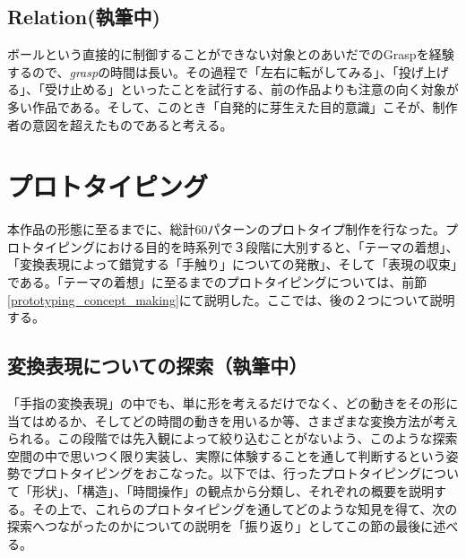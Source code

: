 \subsection*{Relation(執筆中)}
ボールという直接的に制御することができない対象とのあいだでのGraspを経験するので、\textit{grasp}の時間は長い。その過程で「左右に転がしてみる」、「投げ上げる」、「受け止める」といったことを試行する、前の作品よりも注意の向く対象が多い作品である。そして、このとき「自発的に芽生えた目的意識」こそが、制作者の意図を超えたものであると考える。




\section{プロトタイピング}
本作品の形態に至るまでに、総計60パターンのプロトタイプ制作を行なった。プロトタイピングにおける目的を時系列で３段階に大別すると、「テーマの着想」、「変換表現によって錯覚する「手触り」についての発散」、そして「表現の収束」である。「テーマの着想」に至るまでのプロトタイピングについては、前節\ref{prototyping_concept_making}にて説明した。ここでは、後の２つについて説明する。

\subsection{変換表現についての探索（執筆中）}
「手指の変換表現」の中でも、単に形を考えるだけでなく、どの動きをその形に当てはめるか、そしてどの時間の動きを用いるか等、さまざまな変換方法が考えられる。この段階では先入観によって絞り込むことがないよう、このような探索空間の中で思いつく限り実装し、実際に体験することを通して判断するという姿勢でプロトタイピングをおこなった。以下では、行ったプロトタイピングについて「形状」、「構造」、「時間操作」の観点から分類し、それぞれの概要を説明する。その上で、これらのプロトタイピングを通してどのような知見を得て、次の探索へつながったのかについての説明を「振り返り」としてこの節の最後に述べる。

